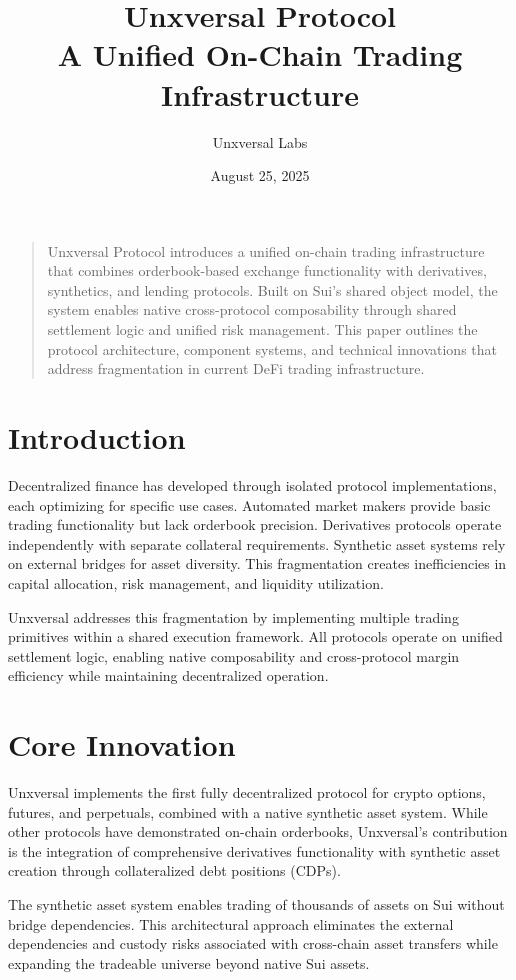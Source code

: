 \documentclass[12pt]{article}
\title{\vspace{2in}Unxversal Protocol\\[0.5em]\large A Unified On-Chain Trading Infrastructure}
\author{Unxversal Labs}
\date{August 25, 2025}
\renewenvironment{abstract}{%
    \cleardoublepage
    \null\vfill
    \begin{center}%
    \bfseries \abstractname\vspace{-.5em}\vspace{0pt}%
    \end{center}%
    \begin{quote}
}{\end{quote}\vfill\null\clearpage}
\begin{document}
\maketitle
\thispagestyle{empty}
\clearpage

\begin{abstract}
Unxversal Protocol introduces a unified on-chain trading infrastructure that combines orderbook-based exchange functionality with derivatives, synthetics, and lending protocols. Built on Sui's shared object model, the system enables native cross-protocol composability through shared settlement logic and unified risk management. This paper outlines the protocol architecture, component systems, and technical innovations that address fragmentation in current DeFi trading infrastructure.
\end{abstract}

\section{Introduction}
Decentralized finance has developed through isolated protocol implementations, each optimizing for specific use cases. Automated market makers provide basic trading functionality but lack orderbook precision. Derivatives protocols operate independently with separate collateral requirements. Synthetic asset systems rely on external bridges for asset diversity. This fragmentation creates inefficiencies in capital allocation, risk management, and liquidity utilization.

Unxversal addresses this fragmentation by implementing multiple trading primitives within a shared execution framework. All protocols operate on unified settlement logic, enabling native composability and cross-protocol margin efficiency while maintaining decentralized operation.

\section{Core Innovation}
Unxversal implements the first fully decentralized protocol for crypto options, futures, and perpetuals, combined with a native synthetic asset system. While other protocols have demonstrated on-chain orderbooks, Unxversal's contribution is the integration of comprehensive derivatives functionality with synthetic asset creation through collateralized debt positions (CDPs).

The synthetic asset system enables trading of thousands of assets on Sui without bridge dependencies. This architectural approach eliminates the external dependencies and custody risks associated with cross-chain asset transfers while expanding the tradeable universe beyond native Sui assets.
\end{document}
